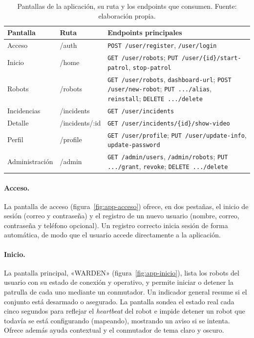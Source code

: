 \begin{table}[htbp]
  \centering
  \small
  \caption{Pantallas de la aplicación, su ruta y los endpoints que consumen. Fuente:
  elaboración propia.}
  \label{tab:pantallas}
  \begin{tabular}{@{}>{\raggedright\arraybackslash}p{2.5cm}
                     >{\ttfamily}l
                     >{\raggedright\arraybackslash}p{6.9cm}@{}}
    \toprule
    \textbf{Pantalla} & \textbf{\normalfont Ruta} & \textbf{Endpoints principales} \\
    \midrule
    Acceso         & /auth          & \texttt{POST /user/register}, \texttt{/user/login} \\
    \addlinespace[3pt]
    Inicio         & /home          & \texttt{GET /user/robots}; \texttt{PUT /user/\{id\}/start-patrol}, \texttt{stop-patrol} \\
    \addlinespace[3pt]
    Robots         & /robots        & \texttt{GET /user/robots}, \texttt{dashboard-url}; \texttt{POST /user/new-robot}; \texttt{PUT .../alias}, \texttt{reinstall}; \texttt{DELETE .../delete} \\
    \addlinespace[3pt]
    Incidencias    & /incidents     & \texttt{GET /user/incidents} \\
    \addlinespace[3pt]
    Detalle        & /incidents/:id & \texttt{GET /user/incidents/\{id\}/show-video} \\
    \addlinespace[3pt]
    Perfil         & /profile       & \texttt{GET /user/profile}; \texttt{PUT /user/update-info}, \texttt{update-password} \\
    \addlinespace[3pt]
    Administración & /admin         & \texttt{GET /admin/users}, \texttt{/admin/robots}; \texttt{PUT .../grant}, \texttt{revoke}; \texttt{DELETE .../delete} \\
    \bottomrule
  \end{tabular}
\end{table}

\paragraph*{Acceso.} La pantalla de acceso (figura~\ref{fig:app-acceso}) ofrece, en dos
pestañas, el inicio de sesión (correo y contraseña) y el registro de un nuevo usuario
(nombre, correo, contraseña y teléfono opcional). Un registro correcto inicia sesión de
forma automática, de modo que el usuario accede directamente a la aplicación.

\paragraph*{Inicio.} La pantalla principal, «WARDEN» (figura~\ref{fig:app-inicio}), lista
los robots del usuario con su estado de conexión y operativo, y permite iniciar o detener
la patrulla de cada uno mediante un conmutador. Un indicador general resume si el conjunto
está desarmado o asegurado. La pantalla sondea el estado real cada cinco segundos para
reflejar el \textit{heartbeat} del robot e impide detener un robot que todavía se está
configurando (mapeando), mostrando un aviso si se intenta. Ofrece además ayuda contextual
y el conmutador de tema claro y oscuro.

